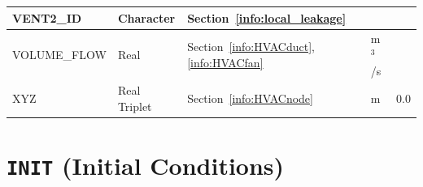 \documentclass[11pt]{book}
\begin{document}
\begin{longtable}{@{\extracolsep{\fill}}|l|l|l|l|l|}
{\ct VENT2\_ID}                 & Character         & Section~\ref{info:local_leakage}                                                   &               &                \\ \hline
{\ct VOLUME\_FLOW}              & Real              & Section~\ref{info:HVACduct}, \ref{info:HVACfan}                               &  m$^3$/s      &                \\ \hline
{\ct XYZ}                       & Real Triplet      & Section~\ref{info:HVACnode}                                                   &  m            &  0.0           \\ \hline
\end{longtable}


\vspace{\baselineskip}



\section{\texorpdfstring{{\tt INIT}}{INIT} (Initial Conditions)}
\end{document}
